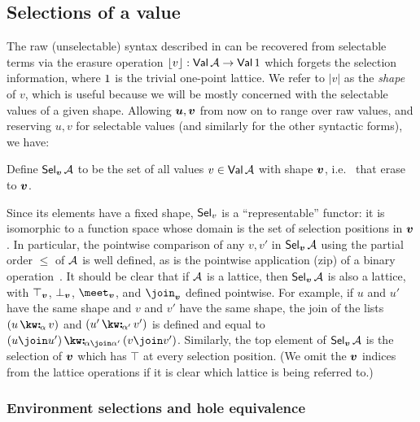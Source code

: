 \subsection{Selections of a value}
\label{sec:data-dependencies:selections}

 The raw (unselectable) syntax described in  can be recovered from selectable terms via the erasure operation $\lfloor v\rfloor: \textup{\textsf{Val}}\,{\mathcal{A}} \to \textup{\textsf{Val}}\,{1}$ which forgets the selection information, where $1$ is the trivial one-point lattice. We refer to $|v|$ as the \emph{shape} of $v$, which is useful because we will be mostly concerned with the selectable values of a given shape. Allowing $\bm{u}, \bm{v}$ from now on to range over raw values, and reserving $u, v$ for selectable values (and similarly for the other syntactic forms), we have:

\begin{definition}
   Define $\textup{\textsf{Sel}}_{\bm{v}}\,{\mathcal{A}}$ to be the set of all values $v \in \textup{\textsf{Val}}\,{\mathcal{A}}$ with shape $\bm{v}$, i.e.
   ~that erase to $\bm{v}$.
\end{definition}

Since its elements have a fixed shape, $\textup{\textsf{Sel}}_{v}$ is a ``representable'' functor: it is isomorphic to a function space whose domain is the set of selection positions in $\bm{v}$. In particular, the pointwise comparison of any $v, v'$ in $\textup{\textsf{Sel}}_{\bm{v}}\,{\mathcal{A}}$ using the partial order $\leq$ of $\mathcal{A}$ is well defined, as is the pointwise application (zip) of a binary operation~\cite{gibbons17}. It should be clear that if $\mathcal{A}$ is a lattice, then $\textup{\textsf{Sel}}_{\bm{v}}\,{\mathcal{A}}$ is also a lattice, with $\top_{\bm{v}}$, $\bot_{\bm{v}}$, $\meet_{\raw{v}}$, and $\join_{\raw{v}}$ defined pointwise. For example, if $u$ and $u'$ have the same shape and $v$ and $v'$ have the same shape, the join of the lists $(\annCons{u}{v}{\alpha})$ and $(\annCons{u'}{v'}{\alpha'})$ is defined and equal to $\annCons{(u \join u')}{(v \join v')}{\alpha \join \alpha'}$. Similarly, the top element of $\textup{\textsf{Sel}}_{\bm{v}}\,{\mathcal{A}}$ is the selection of $\bm{v}$ which has $\top$ at every selection position. (We omit the $\bm{v}$ indices from the lattice operations if it is clear which lattice is being referred to.)

\subsubsection{Environment selections and hole equivalence}

